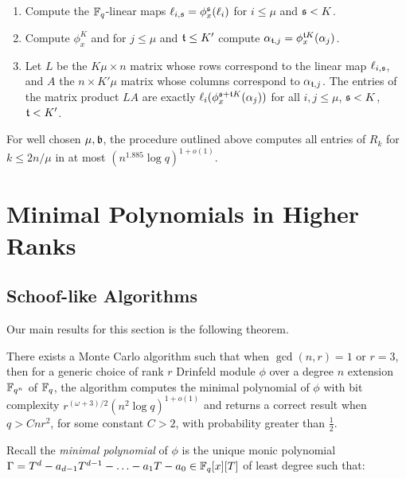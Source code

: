 \begin{enumerate}
    \item Compute the $\mathbb{F}_q$-linear maps $\ell_{i, \frak{s}} =  \phi_x^{\frak{s}}(\ell_i)$ for $i \leq \mu$ and $\frak{s} < K$.
    \item Compute $\phi_x^{K}$ and for $j \leq \mu$ and $\frak{t} \leq K'$ compute $\alpha_{\frak{t}, j} = \phi_x^{\frak{t}K}(\alpha_j)$.
    \item Let $L$ be the $K\mu \times n$ matrix whose rows correspond to the linear map $\ell_{i, \frak{s}}$, and $A$ the $n \times K'\mu$ matrix whose columns correspond to $\alpha_{\frak{t}, j}$. The entries of the matrix product $LA$ are exactly $\ell_i(\phi_x^{\frak{s} + \frak{t}K}(\alpha_j))$ for all $i,j \leq \mu$, $\frak{s} < K$, $\frak{t} < K'$. 
\end{enumerate}

For well chosen $\mu, \frak{b}$, the procedure outlined above computes all entries of $R_k$ for $k \leq 2n/\mu$ in at most $(n^{1.885} \log q)^{1 + o(1)}$. 




\section{Minimal Polynomials in Higher Ranks}


\subsection{Schoof-like Algorithms}

Our main results for this section is the following theorem.

\begin{theorem}\label{schooflike}
There exists a Monte Carlo algorithm such that when $\gcd(n,r) = 1$ or $r = 3$, then for a generic choice of rank $r$ Drinfeld module $\phi$ over a degree $n$ extension $\mathbb{F}_{q^n}$ of  $\mathbb{F}_q$, the algorithm computes the minimal polynomial of $\phi$ with bit complexity $r^{(\omega+3)/2}(n^2 \log q)^{1 + o(1)}$ and returns a correct result when $q > Cnr^2$, for some constant $C > 2$, with probability greater than $\frac{1}{2}$.
\end{theorem}

Recall the \textit{minimal polynomial} of $\phi$ is the unique monic polynomial $\Gamma = T^{d} - a_{d-1}T^{d-1} - \ldots - a_1T - a_0 \in \mathbb{F}_q[x][T]$ of least degree such that:

